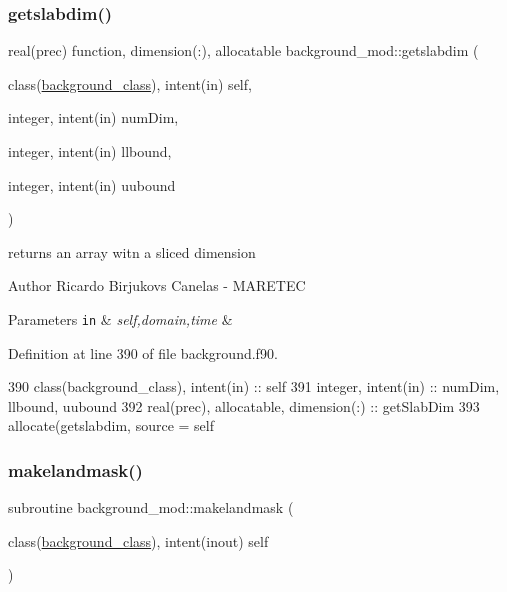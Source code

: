 \subsubsection{\texorpdfstring{getslabdim()}{getslabdim()}}
{\footnotesize\ttfamily real(prec) function, dimension(\+:), allocatable background\+\_\+mod\+::getslabdim (\begin{DoxyParamCaption}\item[{class(\mbox{\hyperlink{structbackground__mod_1_1background__class}{background\+\_\+class}}), intent(in)}]{self,  }\item[{integer, intent(in)}]{num\+Dim,  }\item[{integer, intent(in)}]{llbound,  }\item[{integer, intent(in)}]{uubound }\end{DoxyParamCaption})\hspace{0.3cm}{\ttfamily [private]}}



returns an array witn a sliced dimension 

\begin{DoxyAuthor}{Author}
Ricardo Birjukovs Canelas -\/ M\+A\+R\+E\+T\+EC 
\end{DoxyAuthor}

\begin{DoxyParams}[1]{Parameters}
\mbox{\tt in}  & {\em self,domain,time} & \\
\hline
\end{DoxyParams}


Definition at line 390 of file background.\+f90.


\begin{DoxyCode}
390     \textcolor{keywordtype}{class}(background\_class), \textcolor{keywordtype}{intent(in)} :: self
391     \textcolor{keywordtype}{integer}, \textcolor{keywordtype}{intent(in)} :: numDim, llbound, uubound
392     \textcolor{keywordtype}{real(prec)}, \textcolor{keywordtype}{allocatable}, \textcolor{keywordtype}{dimension(:)} :: getSlabDim
393     \textcolor{keyword}{allocate}(getslabdim, source = self%
\end{DoxyCode}
\mbox{\label{namespacebackground__mod_ad6c54d2cf1d1981fb928cd14d387aa8b}} 
\subsubsection{\texorpdfstring{makelandmask()}{makelandmask()}}
{\footnotesize\ttfamily subroutine background\+\_\+mod\+::makelandmask (\begin{DoxyParamCaption}\item[{class(\mbox{\hyperlink{structbackground__mod_1_1background__class}{background\+\_\+class}}), intent(inout)}]{self }\end{DoxyParamCaption})\hspace{0.3cm}{\ttfamily [private]}}



